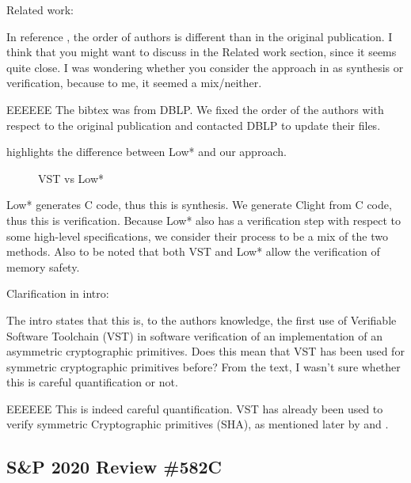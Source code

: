 Related work:

\newcommand{\rbar}{\cite{DBLP:journals/corr/BhargavanDFHPRR17}}

In reference \rbar, the order of authors is different than
in the original publication. I think that you might want to
discuss \rbar in the Related work section, since it seems quite
close. I was wondering whether you consider the approach
in \rbar as synthesis or verification, because to me, it seemed
a mix/neither.

\begin{answer}{EEEEEE}
The bibtex was from DBLP. We fixed the order of the
authors with respect to the original publication and contacted
DBLP to update their files.

 highlights the difference between Low*
and our approach.

\begin{figure}[H]
\centering

\caption{VST vs Low*}
\label{tikz:LowVST}
\end{figure}

Low* generates C code, thus this is synthesis. We generate
Clight from C code, thus this is verification. Because Low*
also has a verification step with respect to some high-level
specifications, we consider their process to be a mix of the
two methods. Also to be noted that both VST and Low*
allow the verification of memory safety.
\end{answer}

Clarification in intro:

The intro states that this is, to the authors knowledge, the
first use of Verifiable Software Toolchain (VST) in software
verification of an implementation of an asymmetric cryptographic
primitives. Does this mean that VST has been used
for symmetric cryptographic primitives before? From the text,
I wasn’t sure whether this is careful quantification or not.

\begin{answer}{EEEEEE}
This is indeed careful quantification. VST has already
been used to verify symmetric Cryptographic primitives
(\eg SHA), as mentioned later by \cite{Beringer2015VerifiedCA} and \cite{2015-Appel}.
\end{answer}


\subsection{S\&P 2020 Review \#582C}

